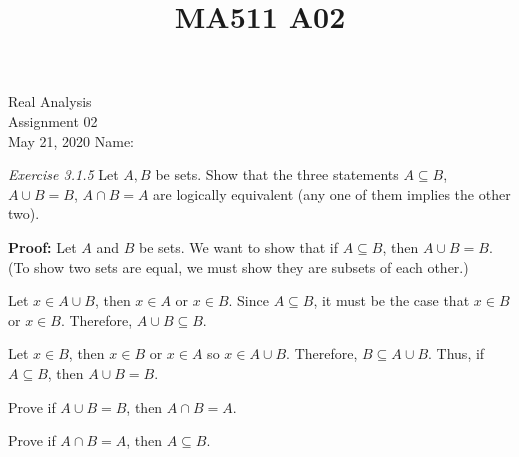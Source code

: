 \documentclass[12pt]{article}
\title{MA511 A02}
\begin{document}
\begin{flushleft}
{\sc \Large Real Analysis} \\ 
\medskip
Assignment 02\\
May 21, 2020
\hfill Name: \underline{\hspace{3.0in}} \\

\setdefaultleftmargin{0pt}{}{}{}{}{}

\textit{Exercise 3.1.5} Let \(A,B\) be sets. Show that the three statements \(A\subseteq B\), \(A \cup B = B\), \(A \cap B = A\) are logically equivalent (any one of them implies the other two).\vfill 

\textbf{Proof:}
Let \(A\) and $B$ be sets. %
We want to show that if \(A\subseteq B\), then \(A\cup B=B\).  (To show two sets are equal, we must show they are subsets of each other.)

Let \(x\in A\cup B\), then \(x\in A\) or \(x\in B\).  Since \(A\subseteq B\), it must be the case that \(x\in B\) or \(x\in B\).  Therefore, \(A\cup B\subseteq B\).

Let \(x\in B\), then \(x\in B\) or \(x\in A\) so \(x\in A\cup B\).  Therefore, \(B\subseteq A\cup B\).  Thus, if \(A\subseteq B\), then \(A\cup B=B\).\vfill

Prove if \(A\cup B=B\), then \(A\cap B=A\).\vfill

Prove if \(A\cap B=A\), then \(A\subseteq B\).\vfill


\end{flushleft}
\end{document}

